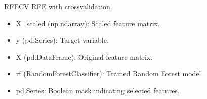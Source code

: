 \documentclass[letterpaper,10pt,english]{sphinxmanual}
\begin{document}
\begin{fulllineitems}
\label{\detokenize{eda:eda.rfecv_selection}}
\pysigstartsignatures
{}
\pysigstopsignatures
\sphinxAtStartPar
RFECV \sphinxhyphen{} RFE with cross\sphinxhyphen{}validation.
\begin{description}
\begin{itemize}
\item {} 
\sphinxAtStartPar
X\_scaled (np.ndarray): Scaled feature matrix.

\item {} 
\sphinxAtStartPar
y (pd.Series): Target variable.

\item {} 
\sphinxAtStartPar
X (pd.DataFrame): Original feature matrix.

\item {} 
\sphinxAtStartPar
rf (RandomForestClassifier): Trained Random Forest model.

\end{itemize}

\begin{itemize}
\item {} 
\sphinxAtStartPar
pd.Series: Boolean mask indicating selected features.

\end{itemize}

\end{description}

\end{fulllineitems}

\end{document}
